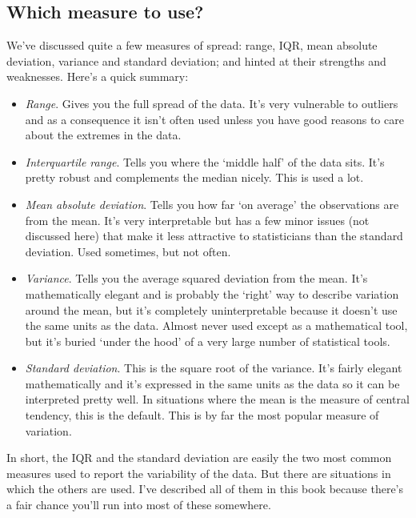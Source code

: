 \documentclass[
]{book}
\providecommand{\tightlist}{%
  \setlength{\itemsep}{0pt}\setlength{\parskip}{0pt}}
\begin{document}
\hypertarget{which-measure-to-use}{%
\subsection{Which measure to use?}\label{which-measure-to-use}}

We've discussed quite a few measures of spread: range, IQR, mean absolute deviation, variance and standard deviation; and hinted at their strengths and weaknesses. Here's a quick summary:

\begin{itemize}
\tightlist
\item
  \emph{Range}. Gives you the full spread of the data. It's very vulnerable to outliers and as a consequence it isn't often used unless you have good reasons to care about the extremes in the data.
\item
  \emph{Interquartile range}. Tells you where the `middle half' of the data sits. It's pretty robust and complements the median nicely. This is used a lot.
\item
  \emph{Mean absolute deviation}. Tells you how far `on average' the observations are from the mean. It's very interpretable but has a few minor issues (not discussed here) that make it less attractive to statisticians than the standard deviation. Used sometimes, but not often.
\item
  \emph{Variance}. Tells you the average squared deviation from the mean. It's mathematically elegant and is probably the `right' way to describe variation around the mean, but it's completely uninterpretable because it doesn't use the same units as the data. Almost never used except as a mathematical tool, but it's buried `under the hood' of a very large number of statistical tools.
\item
  \emph{Standard deviation}. This is the square root of the variance. It's fairly elegant mathematically and it's expressed in the same units as the data so it can be interpreted pretty well. In situations where the mean is the measure of central tendency, this is the default. This is by far the most popular measure of variation.
\end{itemize}

In short, the IQR and the standard deviation are easily the two most common measures used to report the variability of the data. But there are situations in which the others are used. I've described all of them in this book because there's a fair chance you'll run into most of these somewhere.
\end{document}
